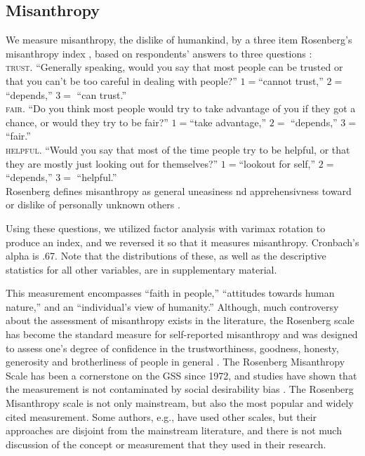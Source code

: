 \documentclass[10pt, letterpaper]{article}
\begin{document}
\begin{spacing}{1.4}
\subsection*{Misanthropy}

We measure misanthropy, the dislike of humankind, by a three item  Rosenberg's  misanthropy index \citep{rosenberg56}, based on respondents' answers to three questions \citep{smith97}:\\

\indent\textsc{trust}. ``Generally speaking, would you say that most people can be trusted or that you can't be too
careful in dealing with people?''  $1=$``cannot trust,'' $2=$     ``depends,'' $3=$   ``can trust.''\\
\indent\textsc{fair}. ``Do you think most people would try to take advantage of you if they got a chance, or
would they try to be fair?'' $1=$``take advantage,'' $2=$       ``depends,'' $3=$          ``fair.'' \\
\indent\textsc{helpful}. ``Would you say that most of the time people try to be helpful, or that they are mostly just
looking out for themselves?'' $1=$``lookout for self,'' $2=$       ``depends,'' $3=$        ``helpful.''\\ 

Rosenberg defines misanthropy as general uneasiness nd apprehensivness toward or
dislike of personally unknown others \cite{rosenberg56}.

Using these questions, we utilized factor analysis with varimax rotation to produce an index, and we reversed it so that it measures misanthropy. Cronbach's alpha is .67. Note that the distributions of these, as well as the descriptive statistics for all other variables, are in supplementary material.

This measurement encompasses ``faith in people,'' ``attitudes towards human nature,'' and an ``individual's view of humanity.'' Although, much controversy about the assessment of misanthropy exists in the literature, the Rosenberg scale has become the standard measure for self-reported misanthropy and was designed to assess one's degree of confidence in the trustworthiness, goodness, honesty, generosity and brotherliness of people in general \citep{rosenberg56}. The Rosenberg Misanthropy Scale has been a cornerstone on the GSS since 1972, and studies have shown that the measurement is not contaminated by social desirability bias \citep{ray81}. 
The Rosenberg Misanthropy scale is not only mainstream, but also the most popular and widely cited measurement. Some authors, e.g.,  
\citet{wuensch2002misanthropy} have used other scales, but their approaches are disjoint from the mainstream literature, and there is not much discussion of the concept or measurement that they used in their research.  


\end{spacing}
\end{document}
